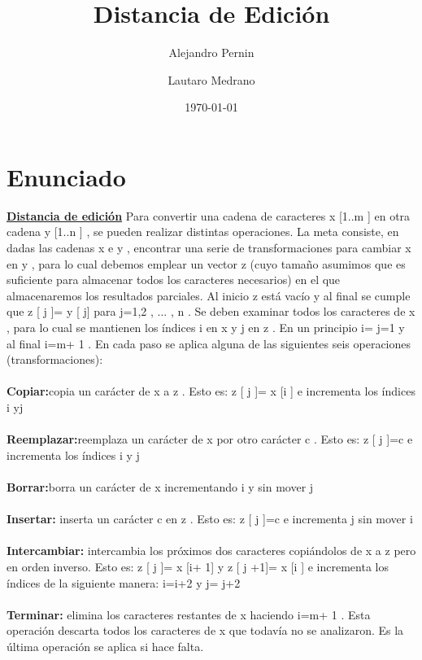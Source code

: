 \documentclass[12pt]{article}
\title{Distancia de Edición}
\author{
        Alejandro Pernin \\
                \and
        Lautaro Medrano\\
}
\date{\today}
\begin{document}
\maketitle

\newpage
\tableofcontents

\newpage

\section{Enunciado}
\textbf{\underline{Distancia de edición}}
Para convertir una cadena de caracteres x [1..m ] en otra cadena y [1..n ] , se pueden
realizar distintas operaciones. La meta consiste, en dadas las cadenas x e y ,
encontrar una serie de transformaciones para cambiar x en y , para lo cual debemos
emplear un vector z (cuyo tamaño asumimos que es suficiente para almacenar todos los
caracteres necesarios) en el que almacenaremos los resultados parciales. Al inicio z
está vacío y al final se cumple que z [ j ]= y [ j] para j=1,2 , ... , n . Se deben examinar
todos los caracteres de x , para lo cual se mantienen los índices i en x y j en z .
En un principio i= j=1 y al final i=m+ 1 . En cada paso se aplica alguna de las
siguientes seis operaciones (transformaciones):
\\\\
\textbf{Copiar:}copia un carácter de x a z . Esto es: z [ j ]= x [i ] e incrementa los índices i
yj
\\\\
\textbf{Reemplazar:}reemplaza un carácter de x por otro carácter c . Esto es: z [ j ]=c e
incrementa los índices i y j
\\\\
\textbf{Borrar:}borra un carácter de x incrementando i y sin mover j
\\\\
\textbf{Insertar:} inserta un carácter c en z . Esto es: z [ j ]=c e incrementa j sin mover i
\\\\
\textbf{Intercambiar:} intercambia los próximos dos caracteres copiándolos de x a z pero en
orden inverso. Esto es: z [ j ]= x [i+ 1] y z [ j +1]= x [i ] e incrementa los índices de la
siguiente manera: i=i+2 y j= j+2
\\\\
\textbf{Terminar:} elimina los caracteres restantes de x haciendo i=m+ 1 . Esta operación
descarta todos los caracteres de x que todavía no se analizaron. Es la última operación
se aplica si hace falta.
\end{document}
